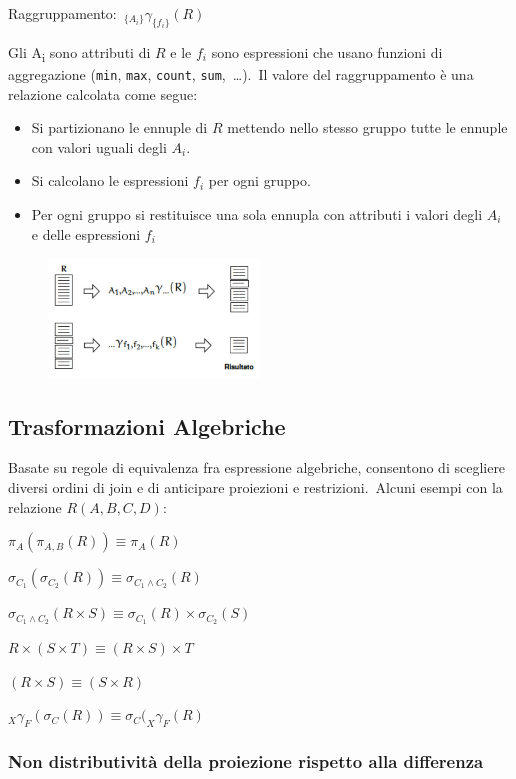 Raggruppamento:\ $ _{\{A_i\}}\gamma_{\{f_i\}}(R)$

Gli A\textsubscript{i} sono attributi di $R$ e le $f_i$ sono espressioni che usano funzioni di aggregazione (\texttt{min}, \texttt{max}, \texttt{count}, \texttt{sum},\ \dots).\
Il valore del raggruppamento è una relazione calcolata come segue:
\begin{itemize}
	\item Si partizionano le ennuple di $R$ mettendo nello stesso gruppo tutte le ennuple con valori uguali degli $A_i$.
	\item Si calcolano le espressioni $f_i$ per ogni gruppo.
	\item Per ogni gruppo si restituisce una sola ennupla con attributi i valori degli $A_i$ e delle espressioni $f_i$
\end{itemize}

\begin{figure}[H]
	\centering
	\includegraphics[width=0.5\textwidth]{immagini/Raggruppamento.jpg}
\end{figure}

\subsection{Trasformazioni Algebriche}

Basate su regole di equivalenza fra espressione algebriche, consentono di scegliere diversi ordini di join e di anticipare proiezioni e restrizioni.\
Alcuni esempi con la relazione $R(A, B, C, D)$:

$\pi_A(\pi_{A,B}(R)) \equiv \pi_A(R)$

$\sigma_{C_1}(\sigma_{C_2}(R)) \equiv \sigma_{C_1 \land C_2}(R)$

$\sigma_{C_1 \land C_2}(R \times S) \equiv \sigma_{C_1}(R) \times \sigma_{C_2}(S) $

$R \times (S \times T) \equiv (R \times S) \times T$

$(R \times S) \equiv (S \times R)$

$_X\gamma_F(\sigma_C(R)) \equiv \sigma_C(_X\gamma_F(R) $

\subsubsection{Non distributività della proiezione rispetto alla differenza}

